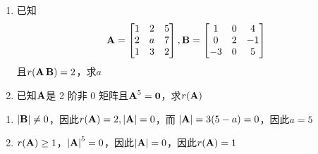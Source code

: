 \documentclass{article}
\begin{document}
\begin{examplle}[]
\begin{enumerate}
\item 已知
\begin{equation*}
\operatorname{\textbf{A}}=
\begin{bmatrix}
1&2&5\\2&a&7\\1&3&2
\end{bmatrix},\operatorname{\textbf{B}}=
\begin{bmatrix}
1&0&4\\0&2&-1\\-3&0&5
\end{bmatrix}
\end{equation*}
且\(r(\operatorname{\textbf{A}}\operatorname{\textbf{B}})=2\)，求\(a\)
\item 已知\(\operatorname{\textbf{A}}\)是 2 阶非 0 矩阵且\(\operatorname{\textbf{A}}^5=\mathbf{0}\)，求\(r(\operatorname{\textbf{A}})\)
\end{enumerate}


\begin{enumerate}
\item \(\abs{\bB}\neq0\)，因此\(r(\bA)=2,\abs{\bA}=0\)，而
\(\abs{\bA}=3(5-a)=0\)，因此\(a=5\)
\item \(r(\operatorname{\textbf{A}})\ge1\)，\(\abs{\bA}^5=0\)，因此\(\abs{\bA}=0\)，因此\(r(\operatorname{\textbf{A}})=1\)
\end{enumerate}
\end{examplle}
\end{document}
